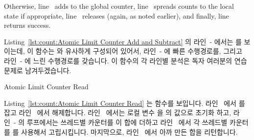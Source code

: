 \begin{lineref}
\begin{lineref}
Otherwise, line~ adds  to the global counter,
line~
spreads counts to the local state if appropriate, line~ releases
 (again, as noted earlier), and finally,
line~
returns success.
\fi
\end{lineref}

\begin{lineref}
Listing~\ref{lst:count:Atomic Limit Counter Add and Subtract} 의
라인~-
에서는  를 보이는데, 이 함수는  와 유사하게
구성되어 있어서, 라인~- 에 빠른 수행경로를, 그리고
라인~- 에 느린 수행경로를 갖습니다.
이 함수의 각 라인별 분석은 독자 여러분의 연습문제로 남겨두겠습니다.

\end{lineref}

\begin{listing}[tbp]

\caption{Atomic Limit Counter Read}
\label{lst:count:Atomic Limit Counter Read}
\end{listing}

\begin{lineref}
Listing~\ref{lst:count:Atomic Limit Counter Read} 는  함수를
보입니다.
라인~ 에서  를 잡고 라인~ 에서
해제합니다.
라인~ 에서는 로컬 변수  을  의 값으로
초기화 하고, 라인~- 의 루프에서는 쓰레드별 카운터를
이 합에 더하고 라인~ 에서 각 쓰레드별 카운터를
 를 사용해서 고립시킵니다.
마지막으로, 라인~ 에서 아까 만든 합을 리턴합니다.

\end{lineref}


\end{lineref}

